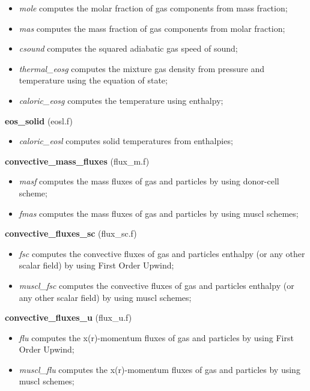\begin{itemize}
\item {\em mole} computes the molar fraction of gas components from mass fraction;
\item {\em mas} computes the mass fraction of gas components from molar fraction;
\item {\em csound} computes the squared adiabatic gas speed of sound;
\item  {\em thermal\_eosg} computes the mixture gas density from pressure and temperature 
using the equation of state;
\item  {\em caloric\_eosg} computes the temperature using enthalpy;
\end{itemize}
%
%
{\large{\bf eos\_solid}} (eosl.f)\\
\begin{itemize}
\item {\em caloric\_eosl} computes solid temperatures from enthalpies;
\end{itemize}
%
%
{\large{\bf convective\_mass\_fluxes}} (flux\_m.f)\\
\begin{itemize}
\item {\em masf} computes the mass fluxes of gas and particles by using donor-cell scheme;
\item {\em fmas} computes the mass fluxes of gas and particles by using muscl schemes;
\end{itemize}
%
%
{\large{\bf convective\_fluxes\_sc}} (flux\_sc.f)\\
\begin{itemize}
\item {\em fsc} computes the convective fluxes of gas and particles enthalpy (or any other scalar field)
 by using First Order Upwind;
\item {\em muscl\_fsc} computes the convective fluxes of gas and particles enthalpy (or any other scalar field)
 by using muscl schemes;
\end{itemize}
%
%
{\large{\bf convective\_fluxes\_u}} (flux\_u.f)\\
\begin{itemize}
\item {\em flu} computes the x(r)-momentum fluxes of gas and particles by using First Order Upwind;
\item {\em muscl\_flu} computes the x(r)-momentum fluxes of gas and particles by using muscl schemes;
\end{itemize}
